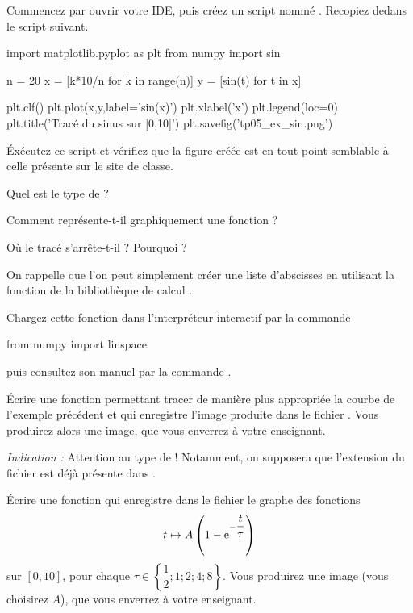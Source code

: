 Commencez par ouvrir votre IDE, puis créez un script nommé . Recopiez dedans le script suivant. 
\begin{pyverbatim}
import matplotlib.pyplot as plt
from numpy import sin

n = 20
x = [k*10/n for k in range(n)]
y = [sin(t) for t in x]

plt.clf()
plt.plot(x,y,label='sin(x)')
plt.xlabel('x')
plt.legend(loc=0)
plt.title('Tracé du sinus sur [0,10]')
plt.savefig('tp05_ex_sin.png')
\end{pyverbatim}
\'Exécutez ce script et vérifiez que la figure créée est en tout point semblable à celle présente sur le site de classe. 

\medskip{}

\question{} Quel est le type de  ?

\medskip{}

\question{} Comment \python{} représente-t-il graphiquement une fonction ? 

\medskip{}

\question{} Où le tracé s'arrête-t-il ? Pourquoi ? 

\medskip{}

On rappelle que l'on peut simplement créer une liste d'abscisses en utilisant la fonction  de la bibliothèque de calcul . 

Chargez cette fonction dans l'interpréteur interactif par la commande 
\begin{pyverbatim}
from numpy import linspace
\end{pyverbatim}
puis consultez son manuel par la commande . 

\medskip{}

\question{}\label{tp05:qu:sin2} Écrire une fonction  permettant tracer de manière plus appropriée la courbe de l'exemple précédent et qui enregistre l'image produite dans le fichier . 
Vous produirez alors une image, que vous enverrez à votre enseignant. 

\emph{Indication :} Attention au type de  ! Notamment, on supposera que l'extension du fichier est déjà présente dans .

\medskip{}

\question{}\label{tp05:qu:transitoire} \'Ecrire une fonction  qui enregistre dans le fichier  le graphe des fonctions 
\begin{equation*}
  t\mapsto A\left( 1-\text{e}^{-\dfrac{t}{\tau}}\right)
\end{equation*}
sur $[0,10]$, pour chaque $\tau\in\left\{\dfrac{1}{2};1;2;4;8\right\}$. 
Vous produirez une image (vous choisirez $A$), que vous enverrez à votre enseignant. 

